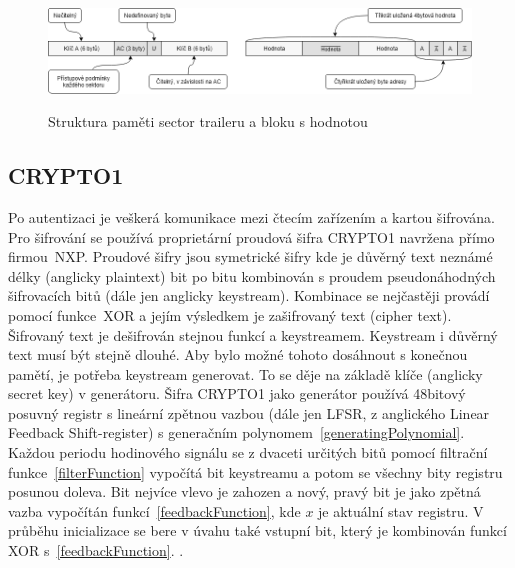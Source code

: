 \begin{figure}[ht]\centering
  \centering
  \includegraphics[width=\linewidth]{obrazky-figures/LogicalStructureBetter.png}\\[1pt]  
  \caption{Struktura paměti sector traileru a bloku s hodnotou\cite{PracticalAttackOnMifare}}    
  \label{obrazekStrukturaSpecialnichBloku}
\end{figure}

\subsection{CRYPTO1}
\label{crypto1section}
Po autentizaci je veškerá komunikace mezi čtecím zařízením a kartou šifrována. Pro šifrování se používá proprietární proudová šifra CRYPTO1 navržena přímo firmou~NXP\cite{Mifare_Classic_story}. Proudové šifry jsou symetrické šifry kde je důvěrný text neznámé délky (anglicky plaintext) bit po bitu kombinován s proudem pseudonáhodných šifrovacích bitů (dále jen anglicky keystream). Kombinace se nejčastěji provádí pomocí funkce~XOR a jejím výsledkem je zašifrovaný text (cipher text). Šifrovaný text je dešifrován stejnou funkcí a keystreamem. Keystream i důvěrný text musí být stejně dlouhé. Aby bylo možné tohoto dosáhnout s konečnou pamětí, je potřeba keystream generovat. To se děje na základě klíče (anglicky secret key) v generátoru\cite{Stream_ciphers}. Šifra CRYPTO1 jako generátor používá 48bitový posuvný registr s lineární zpětnou vazbou (dále jen LFSR, z anglického Linear Feedback Shift-register) s generačním polynomem~\ref{generatingPolynomial}. Každou periodu hodinového signálu se z dvaceti určitých bitů pomocí filtrační funkce~\ref{filterFunction} vypočítá bit keystreamu a potom se všechny bity registru posunou doleva. Bit nejvíce vlevo je zahozen a nový, pravý bit je jako zpětná vazba vypočítán funkcí~\ref{feedbackFunction}, kde $x$ je aktuální stav registru. V průběhu inicializace se bere v úvahu také vstupní bit, který je kombinován funkcí XOR s~\ref{feedbackFunction}. \cite{Dismantling_Mifare_Classic}.

